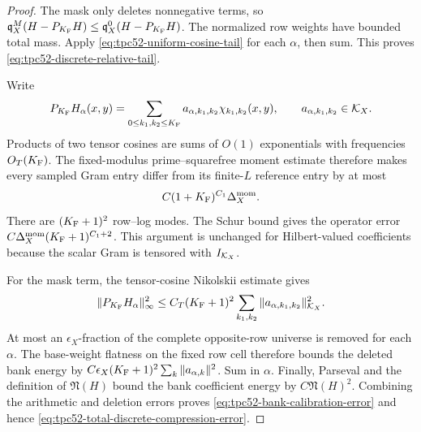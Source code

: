\begin{proof}
The mask only deletes nonnegative terms, so
\(\mathfrak q_X^M(H-P_{K_{\rm F}}H)
\leq\mathfrak q_X^0(H-P_{K_{\rm F}}H)\).  The normalized
row weights have bounded total mass.  Apply
\eqref{eq:tpc52-uniform-cosine-tail} for each \(\alpha\), then sum.
This proves \eqref{eq:tpc52-discrete-relative-tail}.

Write
\[
 P_{K_{\rm F}}H_\alpha(x,y)
 =\sum_{0\leq k_1,k_2\leq K_{\rm F}}
  a_{\alpha,k_1,k_2}\chi_{k_1,k_2}(x,y),
 \qquad a_{\alpha,k_1,k_2}\in\mathcal K_X.
\]
Products of two tensor cosines are sums of \(O(1)\) exponentials with
frequencies \(O_T(K_{\rm F})\).  The fixed-modulus prime--squarefree moment
estimate therefore makes every sampled Gram entry differ from its
finite-\(L\) reference entry by at most
\[
 C(1+K_{\rm F})^{C_1}\Delta_X^{\rm mom}.
\]
There are \((K_{\rm F}+1)^2\) row--log modes.  The Schur bound gives the
operator error
\(C\Delta_X^{\rm mom}(K_{\rm F}+1)^{C_1+2}\).  This argument is unchanged
for Hilbert-valued coefficients because the scalar Gram is tensored
with \(I_{\mathcal K_X}\).

For the mask term, the tensor-cosine Nikolskii estimate gives
\[
 \|P_{K_{\rm F}}H_\alpha\|_\infty^2
 \leq C_T(K_{\rm F}+1)^2
       \sum_{k_1,k_2}\|a_{\alpha,k_1,k_2}\|_{\mathcal K_X}^2.
\]
At most an \(\epsilon_X\)-fraction of the complete opposite-row universe
is removed for each \(\alpha\).  The base-weight flatness on the fixed
row cell therefore bounds the deleted bank energy by
\(C\epsilon_X(K_{\rm F}+1)^2\sum_k\|a_{\alpha,k}\|^2\).  Sum in \(\alpha\).
Finally, Parseval and the definition of
\(\mathfrak N(H)\) bound the bank coefficient energy by
\(C\mathfrak N(H)^2\).  Combining the arithmetic and deletion errors
proves \eqref{eq:tpc52-bank-calibration-error} and hence
\eqref{eq:tpc52-total-discrete-compression-error}.
\end{proof}

